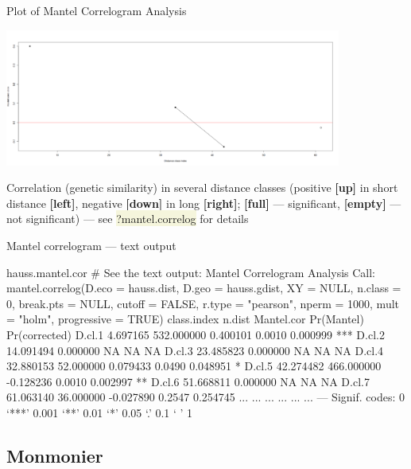 \documentclass[compress, xelatex, 11pt, xcolor=svgnames, aspectratio=169,
	hyperref={
		bookmarks=true,
		unicode=true,
		colorlinks=true,
		pdftitle={Molecular data in R},
		plainpages=false,
		pdfauthor={Vojtech Zeisek},
		pdfsubject={Course about phylogeny and evolution in R},
		pdfcreator={XeLaTeX},
		pdfkeywords={R, evolution, phylogeny, molecular data},
		linkcolor=Crimson, %
		anchorcolor=Magenta, %
		citecolor=Magenta, %
		filecolor=Magenta, %
		menucolor=Magenta, %
		urlcolor=DodgerBlue, %
		},
	url={hyphens, lowtilde} %
	]{beamer}
\renewcommand{\texttt}[1]{\colorbox{Beige}{{\ttfamily #1}}}
\begin{document}
\begin{frame}{Plot of Mantel Correlogram Analysis}
	\begin{center}
		\includegraphics[height=4.5cm]{mantel-cor.png}
	\end{center}
	\vfil
	Correlation (genetic similarity) in several distance classes (positive \textbf{[up]} in short distance \textbf{[left]}, negative \textbf{[down]} in long \textbf{[right]}; \textbf{[full]} --- significant, \textbf{[empty]} --- not significant) --- see \texttt{?mantel.correlog} for details
	\vfill
\end{frame}

\begin{frame}[fragile]{Mantel correlogram --- text output}
	\begin{spluscode}
    hauss.mantel.cor # See the text output:
    Mantel Correlogram Analysis
    Call:
    mantel.correlog(D.eco = hauss.dist, D.geo = hauss.gdist, XY = NULL,
      n.class = 0, break.pts = NULL, cutoff = FALSE, r.type = "pearson",
      nperm = 1000, mult = "holm", progressive = TRUE)
            class.index     n.dist Mantel.cor Pr(Mantel) Pr(corrected)
    D.cl.1     4.697165 532.000000   0.400101     0.0010      0.000999 ***
    D.cl.2    14.091494   0.000000         NA         NA            NA
    D.cl.3    23.485823   0.000000         NA         NA            NA
    D.cl.4    32.880153  52.000000   0.079433     0.0490      0.048951 *
    D.cl.5    42.274482 466.000000  -0.128236     0.0010      0.002997 **
    D.cl.6    51.668811   0.000000         NA         NA            NA
    D.cl.7    61.063140  36.000000  -0.027890     0.2547      0.254745
       ...          ...        ...        ...        ...           ...
    ---
    Signif. codes:  0 ‘***’ 0.001 ‘**’ 0.01 ‘*’ 0.05 ‘.’ 0.1 ‘ ’ 1
	\end{spluscode}
\end{frame}

\subsection{Monmonier}
\end{document}
